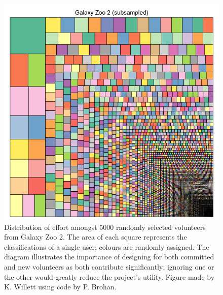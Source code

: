 \documentclass{ar2e}
\begin{document}
\begin{figure}[!ht]
\centering\includegraphics[width=\linewidth]{figs/gz2squares.png}
\caption{Distribution of effort amongst 5000 randomly selected volunteers from
Galaxy Zoo 2. The area of each square represents the classifications of a single
user; colours are randomly assigned. The diagram illustrates the importance of
designing for both committed and new volunteers as both contribute
significantly; ignoring one or the other would greatly reduce the project's utility. 
Figure made by K. Willett using code by P. Brohan.}
\label{fig:gz2}
\end{figure}
\end{document}
